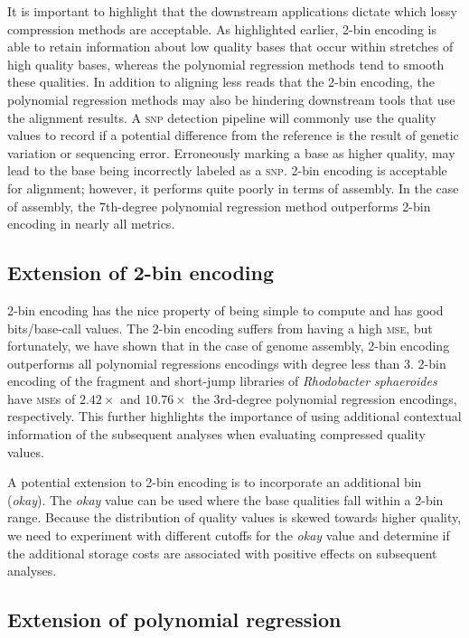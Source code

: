 \documentclass{bioinfo}
\begin{document}
It is important to highlight that the downstream applications dictate which lossy compression methods are acceptable.
As highlighted earlier, 2-bin encoding is able to retain information about low quality bases that occur within stretches of high quality bases, whereas the polynomial regression methods tend to smooth these qualities.
In addition to aligning less reads that the 2-bin encoding, the polynomial regression methods may also be hindering downstream tools that use the alignment results.
A \textsc{snp} detection pipeline will commonly use the quality values to record if a potential difference from the reference is the result of genetic variation or sequencing error.
Erroneously marking a base as higher quality, may lead to the base being incorrectly labeled as a \textsc{snp}.
2-bin encoding is acceptable for alignment; however, it performs quite poorly in terms of assembly.
In the case of assembly, the 7th-degree polynomial regression method outperforms 2-bin encoding in nearly all metrics.

\subsection{Extension of 2-bin encoding}

2-bin encoding has the nice property of being simple to compute and
has good bits/base-call values. The 2-bin encoding suffers from having
a high \textsc{mse}, but fortunately, we have shown that in the case
of genome assembly, 2-bin encoding outperforms all polynomial
regressions encodings with degree less than 3. 2-bin encoding of the
fragment and short-jump libraries of \textit{Rhodobacter sphaeroides}
have \textsc{mse}s of $2.42\times$ and $10.76\times$ the 3rd-degree
polynomial regression encodings, respectively. This further highlights
the importance of using additional contextual information of the
subsequent analyses when evaluating compressed quality values.

A potential extension to 2-bin encoding is to incorporate an
additional bin (\emph{okay}). The \emph{okay} value can be used where
the base qualities fall within a 2-bin range. Because the distribution
of quality values is skewed towards higher quality, we need to
experiment with different cutoffs for the \emph{okay} value and
determine if the additional storage costs are associated with positive
effects on subsequent analyses.

\subsection{Extension of polynomial regression}
\end{document}
